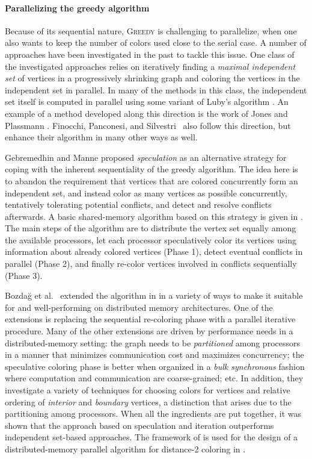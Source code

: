 \documentclass{article}
\begin{document}
\paragraph{Parallelizing the greedy algorithm}

Because of its sequential nature, \textsc{Greedy} is 
challenging to parallelize, when one also wants to keep the number of colors used close
to the serial case. A number of approaches have been 
investigated  in the past to tackle this issue.  One class of the investigated approaches 
relies on iteratively finding a {\em maximal independent set} of vertices in a progressively
shrinking graph and coloring the vertices in the independent set in parallel. 
In many of the methods in this class, the independent set
itself is computed in parallel using some variant of Luby's algorithm \cite{Luby86}.
An example of a method developed along this direction is the work of
Jones and Plassmann \cite{JP93-v2}. Finocchi, Panconesi, and Silvestri~\cite{FPS02}
also follow this direction, but enhance their algorithm in many other ways as well.

Gebremedhin and Manne \cite{GM00} proposed {\em speculation} as an alternative
strategy for coping with the inherent sequentiality of the greedy algorithm.
The idea here is to abandon the requirement that vertices that are colored concurrently
form an independent set, and instead color as many vertices as possible concurrently,
tentatively tolerating potential conflicts, and detect and resolve conflicts afterwards.
A basic shared-memory algorithm based on this strategy is given in \cite{GM00}.
The main steps of the algorithm are to distribute the vertex set equally among the available processors, 
let each processor speculatively color its vertices using information about
already colored vertices (Phase 1), detect eventual conflicts in parallel (Phase 2), 
and finally re-color vertices involved in conflicts sequentially (Phase 3). 

Bozda\u{g} et al.~\cite{BGMBC08} extended the algorithm in \cite{GM00} in a variety of ways 
to make it suitable for and well-performing on distributed memory architectures. 
One of the extensions is replacing the sequential re-coloring phase with 
a parallel iterative procedure.
Many of the other extensions are driven by performance needs in a distributed-memory setting:
the graph needs to be {\em partitioned} among processors in a manner that minimizes
communication cost and maximizes concurrency;
the speculative coloring phase is better when organized in a {\em bulk synchronous} fashion
where computation and communication are coarse-grained; etc.
In addition, they investigate a variety of techniques for choosing colors 
for vertices and relative ordering of
{\em interior} and {\em boundary} vertices, a distinction that arises
due to the partitioning among processors. 
When all the ingredients are put together, it was shown that the 
approach based on speculation and iteration outperforms independent set-based approaches. 
The framework of \cite{BGMBC08} is used for the design of a distributed-memory parallel
algorithm for distance-2 coloring in \cite{BCGMBO:sisc}.
\end{document}

